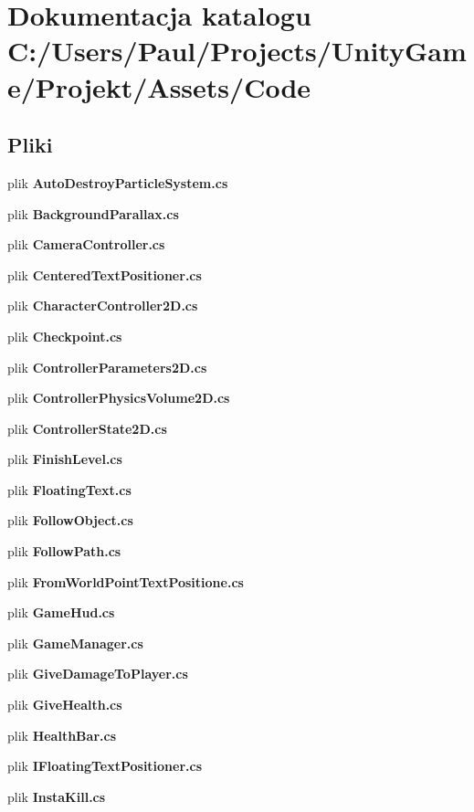 \section{Dokumentacja katalogu C\+:/\+Users/\+Paul/\+Projects/\+Unity\+Game/\+Projekt/\+Assets/\+Code}
\label{dir_e69e2e18185bcff95e067a474cc61209}
\subsection*{Pliki}
\begin{DoxyCompactItemize}
\item 
plik {\bfseries Auto\+Destroy\+Particle\+System.\+cs}
\item 
plik {\bfseries Background\+Parallax.\+cs}
\item 
plik {\bfseries Camera\+Controller.\+cs}
\item 
plik {\bfseries Centered\+Text\+Positioner.\+cs}
\item 
plik {\bfseries Character\+Controller2\+D.\+cs}
\item 
plik {\bfseries Checkpoint.\+cs}
\item 
plik {\bfseries Controller\+Parameters2\+D.\+cs}
\item 
plik {\bfseries Controller\+Physics\+Volume2\+D.\+cs}
\item 
plik {\bfseries Controller\+State2\+D.\+cs}
\item 
plik {\bfseries Finish\+Level.\+cs}
\item 
plik {\bfseries Floating\+Text.\+cs}
\item 
plik {\bfseries Follow\+Object.\+cs}
\item 
plik {\bfseries Follow\+Path.\+cs}
\item 
plik {\bfseries From\+World\+Point\+Text\+Positione.\+cs}
\item 
plik {\bfseries Game\+Hud.\+cs}
\item 
plik {\bfseries Game\+Manager.\+cs}
\item 
plik {\bfseries Give\+Damage\+To\+Player.\+cs}
\item 
plik {\bfseries Give\+Health.\+cs}
\item 
plik {\bfseries Health\+Bar.\+cs}
\item 
plik {\bfseries I\+Floating\+Text\+Positioner.\+cs}
\item 
plik {\bfseries Insta\+Kill.\+cs}

\end{DoxyCompactItemize}
